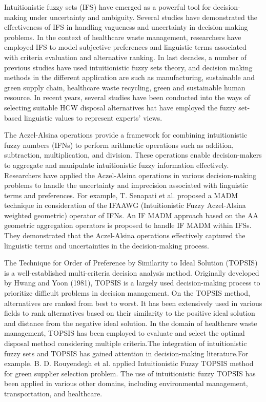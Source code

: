 \begin{flushleft}
\vspace{5mm}

Intuitionistic fuzzy sets (IFS) have emerged as a powerful tool for decision-making under uncertainty and ambiguity. Several studies have demonstrated the effectiveness of IFS in handling vagueness and uncertainty in decision-making problems. In the context of healthcare waste management, researchers have employed IFS to model subjective preferences and linguistic terms associated with criteria evaluation and alternative ranking. In last decades, a number of previous studies have used intuitionistic fuzzy
sets theory, and decision making methods in the different application
are such as manufacturing,
sustainable and green supply chain, healthcare waste recycling, green and sustainable human resource. In recent years, several studies have been conducted
into the ways of selecting suitable HCW disposal alternatives hat
have employed the fuzzy set-based linguistic values to represent
experts’ views. 

\vspace{5mm}

The Aczel-Alsina operations provide a framework for combining intuitionistic fuzzy numbers (IFNs) to perform arithmetic operations such as addition, subtraction, multiplication, and division. These operations enable decision-makers to aggregate and manipulate intuitionistic fuzzy information effectively. Researchers have applied the Aczel-Alsina operations in various decision-making problems to handle the uncertainty and imprecision associated with linguistic terms and preferences.
For example,  T. Senapati et al. \cite{10} proposed a MADM
technique in consideration of the IFAAWG (Intuitionistic Fuzzy Aczel-Alsina weighted geometric) operator of IFNs. An IF
MADM approach based on the AA geometric aggregation operators is
proposed to handle IF MADM within IFSs. They demonstrated that the Aczel-Alsina operations effectively captured the linguistic terms and uncertainties in the decision-making process.

\vspace{5mm}

The Technique for Order of Preference by Similarity to Ideal Solution (TOPSIS) is a well-established multi-criteria decision analysis method. Originally developed by Hwang and Yoon (1981)\cite{5},
TOPSIS is a largely used decision-making
process to prioritize difficult problems in decision management.
On the TOPSIS method, alternatives are ranked
from best to worst. It has been extensively used in various fields to rank alternatives based on their similarity to the positive ideal solution and distance from the negative ideal solution. In the domain of healthcare waste management, TOPSIS has been employed to evaluate and select the optimal disposal method considering multiple criteria.The integration of intuitionistic fuzzy sets and TOPSIS has gained attention in decision-making literature.For example. B. D. Rouyendegh et al.\cite{9} applied Intuitionistic Fuzzy TOPSIS method for green supplier selection
problem. The use of intuitionistic fuzzy TOPSIS has been applied in various other domains, including environmental management, transportation, and healthcare.


\end{flushleft}

